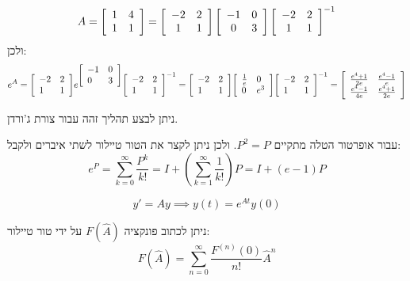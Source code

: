\documentclass{tstextbook}
\begin{document}
\begin{example}
$$A={\left[\begin{array}{l l}{1}&{4}\\ {1}&{1}\end{array}\right]}=\left[{\begin{array}{c c}{-2}&{2}\\ {1}&{1}\end{array}}\right]\left[{\begin{array}{c c}{-1}&{0}\\ {0}&{3}\end{array}}\right]\left[{\begin{array}{c c}{-2}&{2}\\ {1}&{1}\end{array}}\right]^{-1}$$
ולכן:
$$e^{A}={\left[\begin{array}{l l}{-2}&{2}\\ {1}&{1}\end{array}\right]}e^{{\left[\begin{array}{l l}{-1}&{0}\\ {0}&{3}\end{array}\right]}}{\left[\begin{array}{l l}{-2}&{2}\\ {1}&{1}\end{array}\right]}^{-1}={\left[\begin{array}{l l}{-2}&{2}\\ {1}&{1}\end{array}\right]}{\left[\begin{array}{l l}{{\frac{1}{e}}}&{0}\\ {0}&{e^{3}}\end{array}\right]}{\left[\begin{array}{l l}{-2}&{2}\\ {1}&{1}\end{array}\right]}^{-1}={\left[\begin{array}{l l}{{\frac{e^{4}+1}{2e}}}&{{\frac{e^{4}-1}{e}}}\\ {{\frac{e^{4}-1}{4e}}}&{{\frac{e^{4}+1}{2e}}}\end{array}\right]}$$

\end{example}
\begin{remark}
ניתן לבצע תהליך זהה עבור צורת ג'ורדן.

\end{remark}
\begin{proposition}
עבור אופרטור הטלה מתקיים \(P^2 = P\). ולכן ניתן לקצר את הטור טיילור לשתי איברים ולקבל:
$$e^{P}=\sum_{k=0}^{\infty}{\frac{P^{k}}{k!}}=I+\left(\sum_{k=1}^{\infty}{\frac{1}{k!}}\right)P=I+(e-1)P$$

\end{proposition}
\begin{proposition}
$$y' = Ay\implies y(t)=e^{At}y(0)$$

\end{proposition}
\begin{definition}
ניתן לכתוב פונקציה \(F\left( \hat{A} \right)\) על ידי טור טיילור:
$$F({\hat{A}})=\sum_{n=0}^{\infty}{\frac{F^{(n)}(0)}{n!}}{\hat{A}}^{n}$$

\end{definition}
\end{document}
